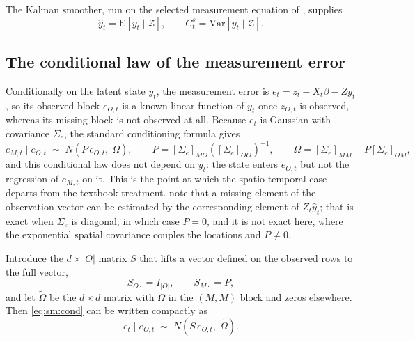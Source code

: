 \documentclass[11pt]{article}
\begin{document}
The Kalman smoother, run on the selected measurement equation of \citet[Sect.~4.10]{DurbinKoopman2012}, supplies
\begin{equation}\label{eq:sm:smooth}
  \hat{y}_t = \mathrm{E}\!\left[y_t \mid \mathcal{Z}\right],
  \qquad
  C^s_t = \mathrm{Var}\!\left[y_t \mid \mathcal{Z}\right].
\end{equation}

\subsection{The conditional law of the measurement error}

Conditionally on the latent state $y_t$, the measurement error is $e_t = z_t - X_t\beta - Z y_t$, so its observed block $e_{O,t}$ is a known linear function of $y_t$ once $z_{O,t}$ is observed, whereas its missing block is not observed at all. Because $e_t$ is Gaussian with covariance $\Sigma_e$, the standard conditioning formula gives
\begin{equation}\label{eq:sm:cond}
  e_{M,t} \mid e_{O,t} \;\sim\; N\!\left(P\, e_{O,t},\; \Omega\right),
  \qquad
  P = \left[\Sigma_e\right]_{MO}\left(\left[\Sigma_e\right]_{OO}\right)^{-1},
  \qquad
  \Omega = \left[\Sigma_e\right]_{MM} - P \left[\Sigma_e\right]_{OM},
\end{equation}
and this conditional law does not depend on $y_t$: the state enters $e_{O,t}$ but not the regression of $e_{M,t}$ on it. This is the point at which the spatio-temporal case departs from the textbook treatment. \citet{DurbinKoopman2012} note that a missing element of the observation vector can be estimated by the corresponding element of $Z_t \hat{y}_t$; that is exact when $\Sigma_e$ is diagonal, in which case $P = 0$, and it is not exact here, where the exponential spatial covariance couples the locations and $P \neq 0$.

Introduce the $d \times |O|$ matrix $S$ that lifts a vector defined on the observed rows to the full vector,
\begin{equation}\label{eq:sm:S}
  S_{O\cdot} = I_{|O|}, \qquad S_{M\cdot} = P,
\end{equation}
and let $\tilde{\Omega}$ be the $d \times d$ matrix with $\Omega$ in the $(M,M)$ block and zeros elsewhere. Then \eqref{eq:sm:cond} can be written compactly as
\begin{equation}\label{eq:sm:compact}
  e_t \mid e_{O,t} \;\sim\; N\!\left(S\, e_{O,t},\; \tilde{\Omega}\right).
\end{equation}
\end{document}
